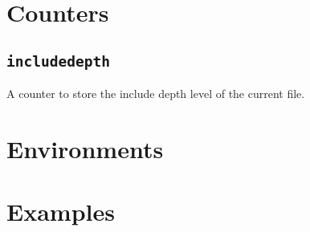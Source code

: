 \documentclass{article}
\begin{document}
\section{Counters}
\subsection{\texttt{includedepth}}\label{sec:counters:includedepth}
    A counter to store the include depth level of the current file.

\section{Environments}

\section{Examples}
\end{document}
